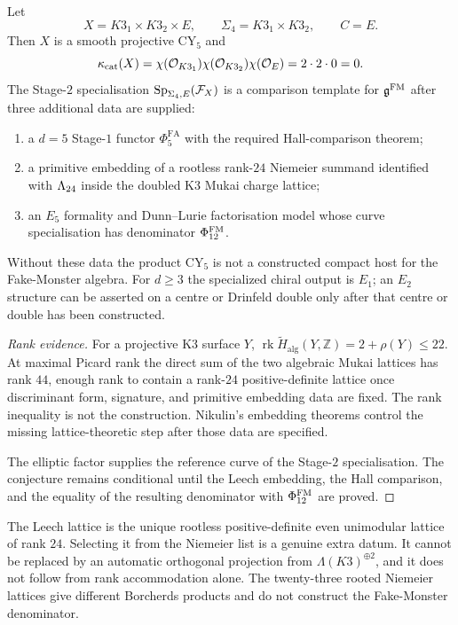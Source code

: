 \begin{conjecture}
\label{wn:conj:d5-k3-k3-e}
Let
\[
  X=K3_1\times K3_2\times E,
  \qquad
  \Sigma_4=K3_1\times K3_2,
  \qquad
  C=E .
\]
Then $X$ is a smooth projective CY$_5$ and
\[
  \kappa_{\mathrm{cat}}(X)
  =
  \chi(\mathcal O_{K3_1})\chi(\mathcal O_{K3_2})\chi(\mathcal O_E)
  =
  2\cdot 2\cdot 0
  =
  0 .
\]
The Stage-$2$ specialisation
$\mathrm{Sp}_{\Sigma_4,E}(\mathcal F_X)$ is a comparison template for $\mathfrak{g}^{\mathrm{FM}}$
after three additional data are supplied:
\begin{enumerate}
\item a $d=5$ Stage-$1$ functor $\Phi^{\mathrm{FA}}_5$ with the required
Hall-comparison theorem;
\item a primitive embedding of a rootless rank-$24$ Niemeier summand
identified with $\Lambda_{24}$ inside the doubled K3 Mukai charge lattice;
\item an $E_5$ formality and Dunn--Lurie factorisation model whose
curve specialisation has denominator $\Phi_{12}^{\mathrm{FM}}$.
\end{enumerate}
Without these data the product CY$_5$ is not a constructed compact
host for the Fake-Monster algebra. For $d\geq3$ the specialized chiral
output is $E_1$; an $E_2$ structure can be asserted on a centre or
Drinfeld double only after that centre or double has been constructed.
\end{conjecture}

\begin{proof}[Rank evidence]
For a projective K3 surface $Y$,
$\operatorname{rk}\widetilde H_{\mathrm{alg}}(Y,\mathbb Z)=2+\rho(Y)\leq
22$. At maximal Picard rank the direct sum of the two algebraic Mukai
lattices has rank $44$, enough rank to contain a rank-$24$ positive-definite
lattice once discriminant form, signature, and primitive embedding data
are fixed. The rank inequality is not the construction. Nikulin's
embedding theorems control the missing lattice-theoretic step after those
data are specified.

The elliptic factor supplies the reference curve of the Stage-$2$
specialisation. The conjecture remains conditional until the Leech
embedding, the Hall comparison, and the equality of the resulting
denominator with $\Phi_{12}^{\mathrm{FM}}$ are proved.
\end{proof}

\begin{remark}
\label{wn:rmk:niemeier-selection}
The Leech lattice is the unique rootless positive-definite even
unimodular lattice of rank $24$. Selecting it from the Niemeier list is
a genuine extra datum. It cannot be replaced by an automatic orthogonal
projection from $\Lambda(K3)^{\oplus 2}$, and it does not follow from
rank accommodation alone. The twenty-three rooted Niemeier lattices give
different Borcherds products and do not construct the Fake-Monster
denominator.
\end{remark}

